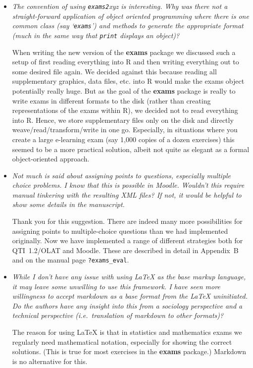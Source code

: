 \documentclass[american]{uibkletter}
\begin{document}
\begin{itemize}

\item {\it
The convention of using \texttt{exams2}xyz is interesting. Why was there not a
straight-forward application of object oriented programming where there is
one common class (say `\texttt{exams}') and methods to generate the appropriate
format (much in the same way that \texttt{print} displays an object)?}

When writing the new version of the \textbf{exams} package we discussed such a setup
of first reading everything into R and then writing everything out to some
desired file again. We decided against this because reading all supplementary
graphics, data files, etc. into R would make the exams object potentially
really huge. But as the goal of the \textbf{exams} package is really to write exams
in different formats to the disk (rather than creating representations of the
exams within R), we decided not to read everything into R. Hence, we store
supplementary files only on the disk and directly weave/read/transform/write
in one go. Especially, in situations where you create a large e-learning exam
(say 1,000 copies of a dozen exercises) this seemed to be a more practical
solution, albeit not quite as elegant as a formal object-oriented approach.
 
\item {\it
Not much is said about assigning points to questions, especially
multiple choice problems. I know that this is possible in Moodle. Wouldn't
this require manual tinkering with the resulting XML files? If not, it
would be helpful to show some details in the manuscript.}

Thank you for this suggestion. There are indeed many more possibilities
for assigning points to multiple-choice questions than we had implemented
originally. Now we have implemented a range of different strategies
both for QTI~1.2/OLAT and Moodle. These are described in detail in
Appendix~B and on the manual page \verb|?exams_eval|.


\item {\it
While I don't have any issue with using {\LaTeX} as the base markup
language, it may leave some unwilling to use this framework. I have seen
more willingness to accept markdown as a base format from the {\LaTeX}
uninitiated. Do the authors have any insight into this from a sociology
perspective and a technical perspective (i.e.\ translation of markdown to
other formats)?}

The reason for using {\LaTeX} is that in statistics and mathematics exams we
regularly need mathematical notation, especially for showing the correct
solutions. (This is true for most exercises in the \textbf{exams} package.)
Markdown is no alternative for this.


\end{itemize}
\end{document}
